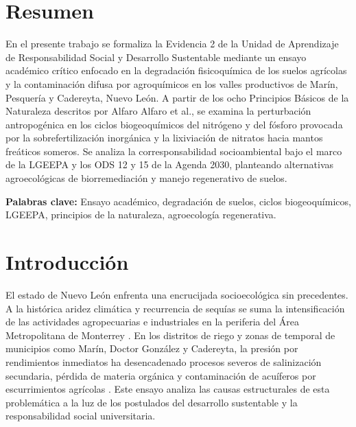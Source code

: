 \documentclass[spanish,letterpaper,oneside]{article}
\begin{document}
\hypersetup{pageanchor=false}
\begingroup
\fontsize{14}{17}\selectfont
\renewcommand{\Huge}{\fontsize{14}{17}\selectfont\bfseries}
\renewcommand{\large}{\fontsize{14}{17}\selectfont}
\templatePortrait
\clearpage
\endgroup
\hypersetup{pageanchor=true}
\templatePagecfg
\singlespacing
\setlength{\tabcolsep}{8pt}
\renewcommand{\arraystretch}{1.18}

\section*{Resumen}
En el presente trabajo se formaliza la Evidencia 2 de la Unidad de Aprendizaje de Responsabilidad Social y Desarrollo Sustentable mediante un ensayo académico crítico enfocado en la degradación fisicoquímica de los suelos agrícolas y la contaminación difusa por agroquímicos en los valles productivos de Marín, Pesquería y Cadereyta, Nuevo León. A partir de los ocho Principios Básicos de la Naturaleza descritos por Alfaro Alfaro et al., se examina la perturbación antropogénica en los ciclos biogeoquímicos del nitrógeno y del fósforo provocada por la sobrefertilización inorgánica y la lixiviación de nitratos hacia mantos freáticos someros. Se analiza la corresponsabilidad socioambiental bajo el marco de la LGEEPA y los ODS 12 y 15 de la Agenda 2030, planteando alternativas agroecológicas de biorremediación y manejo regenerativo de suelos.

\vspace{0.4cm}
\noindent\textbf{Palabras clave:} Ensayo académico, degradación de suelos, ciclos biogeoquímicos, LGEEPA, principios de la naturaleza, agroecología regenerativa.

\section{Introducción}
El estado de Nuevo León enfrenta una encrucijada socioecológica sin precedentes. A la histórica aridez climática y recurrencia de sequías se suma la intensificación de las actividades agropecuarias e industriales en la periferia del Área Metropolitana de Monterrey \parencite{cantu2016}. En los distritos de riego y zonas de temporal de municipios como Marín, Doctor González y Cadereyta, la presión por rendimientos inmediatos ha desencadenado procesos severos de salinización secundaria, pérdida de materia orgánica y contaminación de acuíferos por escurrimientos agrícolas \parencite{conagua2023}. Este ensayo analiza las causas estructurales de esta problemática a la luz de los postulados del desarrollo sustentable y la responsabilidad social universitaria.
\end{document}
